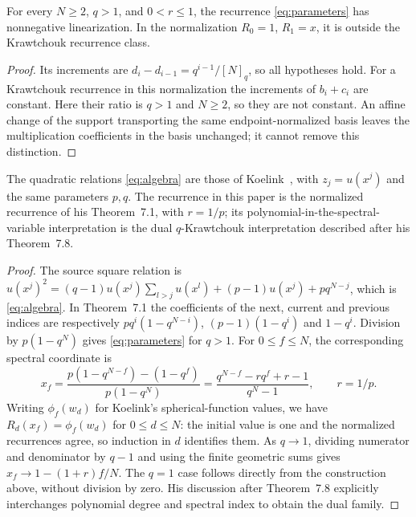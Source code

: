 \begin{corollary}\label{cor:additional}
For every $N\geq2$, $q>1$, and $0<r\leq1$, the recurrence \eqref{eq:parameters} has nonnegative linearization. In the normalization $R_0=1$, $R_1=x$, it is outside the Krawtchouk recurrence class.
\end{corollary}
\begin{proof}
Its increments are $d_i-d_{i-1}=q^{i-1}/[N]_q$, so all hypotheses hold. For a Krawtchouk recurrence in this normalization the increments of $b_i+c_i$ are constant. Here their ratio is $q>1$ and $N\geq2$, so they are not constant. An affine change of the support transporting the same endpoint-normalized basis leaves the multiplication coefficients in the basis unchanged; it cannot remove this distinction.
\end{proof}

\begin{proposition}\label{prop:source}
The quadratic relations \eqref{eq:algebra} are those of Koelink~\cite[Theorem~3.1(ii), relation (3.2)]{koelink}, with $z_j=u(x^j)$ and the same parameters $p,q$. The recurrence in this paper is the normalized recurrence of his Theorem~7.1, with $r=1/p$; its polynomial-in-the-spectral-variable interpretation is the dual $q$-Krawtchouk interpretation described after his Theorem~7.8.
\end{proposition}
\begin{proof}
The source square relation is $u(x^j)^2=(q-1)u(x^j)\sum_{l>j}u(x^l)+(p-1)u(x^j)+pq^{N-j}$, which is \eqref{eq:algebra}. In Theorem~7.1 the coefficients of the next, current and previous indices are respectively $pq^i(1-q^{N-i})$, $(p-1)(1-q^i)$ and $1-q^i$. Division by $p(1-q^N)$ gives \eqref{eq:parameters} for $q>1$. For $0\leq f\leq N$, the corresponding spectral coordinate is
\[
x_f=\frac{p(1-q^{N-f})-(1-q^f)}{p(1-q^N)}
=\frac{q^{N-f}-rq^f+r-1}{q^N-1},\qquad r=1/p.
\]
Writing $\phi_f(w_d)$ for Koelink's spherical-function values, we have $R_d(x_f)=\phi_f(w_d)$ for $0\leq d\leq N$: the initial value is one and the normalized recurrences agree, so induction in $d$ identifies them.
As $q\to1$, dividing numerator and denominator by $q-1$ and using the finite geometric sums gives $x_f\to1-(1+r)f/N$.
The $q=1$ case follows directly from the construction above, without division by zero. His discussion after Theorem~7.8 explicitly interchanges polynomial degree and spectral index to obtain the dual family.
\end{proof}

